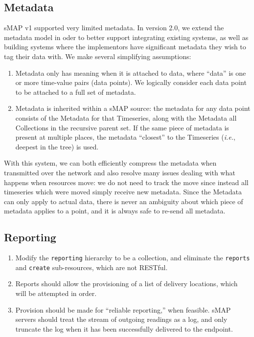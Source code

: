 \documentclass[10pt,letterpaper]{article}
\newcommand{\smap}{sMAP}
\newcommand{\smapversion}{2.0}
\newcommand{\ie}{\textit{i.e.}}
\begin{document}
\subsection{Metadata}

\smap{} v1 supported very limited metadata.  In version \smapversion{}, we
extend the metadata model in oder to better support integrating existing
systems, as well as building systems where the implementors have significant
metadata they wish to tag their data with.  We make several simplifying
assumptions:

\begin{enumerate}
\item Metadata only has meaning when it is attached to data, where ``data'' is
  one or more time-value pairs (data points).  We logically consider each data
  point to be attached to a full set of metadata.
\item Metadata is inherited within a \smap{} source: the metadata for any data
  point consists of the Metadata for that Timeseries, along with the Metadata
  all Collections in the recursive parent set.  If the same piece of metadata
  is present at multiple places, the metadata ``closest'' to the Timeseries
  (\ie, deepest in the tree) is used.
\end{enumerate}

With this system, we can both efficiently compress the metadata when
transmitted over the network and also resolve many issues dealing with what
happens when resources move: we do not need to track the move since instead
all timeseries which were moved simply receive new metadata.  Since the
Metadata can only apply to actual data, there is never an ambiguity about which
piece of metadata applies to a point, and it is always safe to re-send all
metadata.

\subsection{Reporting}
\begin{enumerate}
\item Modify the {\tt reporting} hierarchy to be a collection, and eliminate
  the {\tt reports} and {\tt create} sub-resources, which are not RESTful.
\item Reports should allow the provisioning of a list of delivery locations,
  which will be attempted in order.
\item Provision should be made for ``reliable reporting,'' when feasible.
  \smap{} servers should treat the stream of outgoing readings as a log, and
  only truncate the log when it has been successfully delivered to the
  endpoint.
\end{enumerate}
\end{document}
